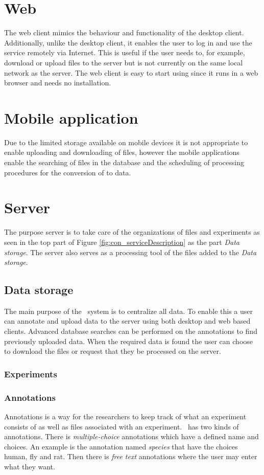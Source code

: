 \section{Web}
The web client mimics the behaviour and functionality of the desktop client. Additionally, unlike the desktop client, it enables the user to log in and use the service remotely via Internet. This is useful if the user needs to, for example, download or upload files to the server but is not currently on the same local network as the server. The web client is easy to start using since it runs in a web browser and needs no installation.


\section{Mobile application}
Due to the limited storage available on mobile devices it is not appropriate to enable uploading and downloading of files, however the mobile applications enable the searching of files in the database and the scheduling of processing procedures for the conversion of  to  data.

\section{Server}
The purpose server is to take care of the organizations of files and experiments as seen in the top part of Figure \ref{fig:con_serviceDescription} as the part \textit{Data storage}. The server also serves as a processing tool of the files added to the \textit{Data storage}. 

\subsection{Data storage}
The main purpose of the \appName\ system is to centralize all data. To enable this a user can annotate and upload data to the server using both desktop and web based clients.
Advanced database searches can be performed on the annotations to find previously uploaded data. When the required data is found the user can choose to download the files or request that they be processed on the server.
\subsubsection{Experiments}


\subsubsection{Annotations}
Annotations is a way for the researchers to keep track of what an experiment consists of as well as files associated with an experiment.
\appName\ has two kinds of annotations. There is \textit{multiple-choice} annotations which have a defined name and choices. An example is the annotation named \textit{species} that have the choices human, fly and rat.
Then there is \textit{free text} annotations where the user may enter what they want.

